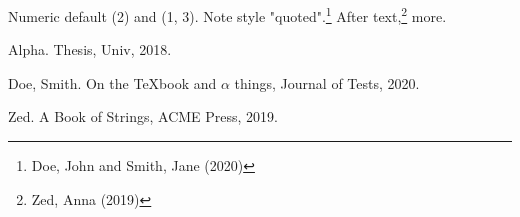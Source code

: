 Numeric default (2) and (1, 3).
Note style "quoted".\footnote{Doe, John and Smith, Jane (2020)} After text,\footnote{Zed, Anna (2019)} more.

\noindent
Alpha. Thesis, Univ, 2018.

\noindent
Doe, Smith. On the {TeX}book and $\alpha$ \alpha{} things, Journal of Tests, 2020.

\noindent
Zed. A Book of Strings, ACME Press, 2019.
